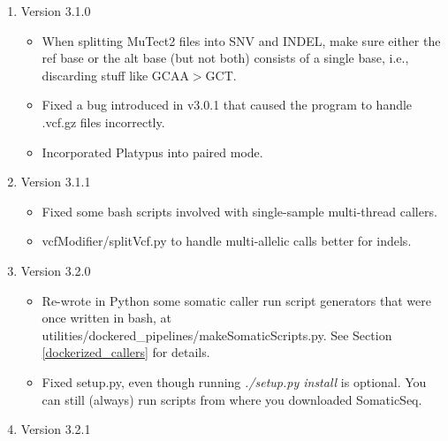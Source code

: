 \documentclass[10pt,letterpaper]{article}
\begin{document}
\begin{sloppypar}
\begin{enumerate}
\begin{itemize}
		\end{itemize}
	


	\item Version 3.1.0
		\begin{itemize}
		
		  \item
		  When splitting MuTect2 files into SNV and INDEL, make sure either the ref base or the alt base (but not both) consists of a single base, i.e., discarding stuff like GCAA$>$GCT.
		  
		  \item
		  Fixed a bug introduced in v3.0.1 that caused the program to handle .vcf.gz files incorrectly.
		  
          \item
          Incorporated Platypus into paired mode.
		  
		\end{itemize}

		
    \item Version 3.1.1
        \begin{itemize}
         
         \item 
         Fixed some bash scripts involved with single-sample multi-thread callers.
         
         \item
         vcfModifier/splitVcf.py to handle multi-allelic calls better for indels. 
         
        \end{itemize}


	\item Version 3.2.0
        \begin{itemize}
         
         \item 
         Re-wrote in Python some somatic caller run script generators that were once written in bash, at utilities/dockered\_pipelines/makeSomaticScripts.py. See Section \ref{dockerized_callers} for details. 
         
         \item
         Fixed setup.py, even though running \textit{./setup.py install} is optional. You can still (always) run scripts from where you downloaded SomaticSeq. 
                  
        \end{itemize}


	\item Version 3.2.1
	

\end{enumerate}
\end{sloppypar}
\end{document}
